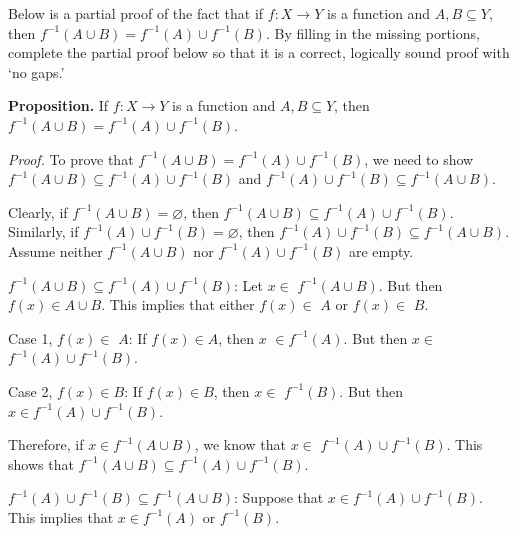 \documentclass[11pt,letterpaper]{article}
\newcommand{\ansun}[2]{\underline{\hspace{#1}#2\hspace{#1}}} %
\begin{document}
\newpage



 Below is a partial proof of the fact that if $f: X \to Y$ is a function and $A, B \subseteq Y$, then $f^{-1}(A \cup B)= f^{-1}(A) \cup f^{-1}(B)$. By filling in the missing portions, complete the partial proof below so that it is a correct, logically sound proof with `no gaps.' \pspace

\noindent \textbf{Proposition.} If $f: X \to Y$ is a function and $A, B \subseteq Y$, then $f^{-1}(A \cup B)= f^{-1}(A) \cup f^{-1}(B)$. \pspace

\textit{Proof.} To prove that $f^{-1}(A \cup B)= f^{-1}(A) \cup f^{-1}(B)$, we need to show \ansun{0cm}{$f^{-1}(A \cup B) \subseteq f^{-1}(A) \cup f^{-1}(B)$} \pspace and \ansun{0cm}{$f^{-1}(A) \cup f^{-1}(B) \subseteq f^{-1}(A \cup B)$}. 


Clearly, if $f^{-1}(A \cup B)= \varnothing$, then $f^{-1}(A \cup B) \subseteq f^{-1}(A) \cup f^{-1}(B)$. Similarly, if $f^{-1}(A) \cup f^{-1}(B)= \varnothing$, then $f^{-1}(A) \cup f^{-1}(B) \subseteq f^{-1}(A \cup B)$. Assume neither $f^{-1}(A \cup B)$ nor $f^{-1}(A) \cup f^{-1}(B)$ are empty. 


$f^{-1}(A \cup B) \subseteq f^{-1}(A) \cup f^{-1}(B)$: Let $x \in$ \ansun{0.52cm}{$f^{-1}(A \cup B)$}. But then $f(x) \in A \cup B$. This implies \pspace that either $f(x) \in$ \ansun{1.35cm}{$A$} or $f(x) \in$ \ansun{1.35cm}{$B$}. \pspace

	\hspace{1cm} Case 1, $f(x) \in$ \ansun{1.35cm}{$A$}: If $f(x) \in A$, then \ansun{1.38cm}{$x$} $\in f^{-1}(A)$. But then \pspace \hspace{1cm} $x \in$ \ansun{0.55cm}{$f^{-1}(A) \cup f^{-1}(B)$}. \pvspace{1cm}

	\hspace{1cm} Case 2, $f(x) \in B$: If $f(x) \in B$, then $x \in$ \ansun{0.9cm}{$f^{-1}(B)$}. But then $x \in f^{-1}(A) \cup f^{-1}(B)$. \pvspace{1cm}

Therefore, if $x \in f^{-1}(A \cup B)$, we know that $x \in$ \ansun{1.07cm}{$f^{-1}(A) \cup f^{-1}(B)$}. This shows \pspace that $f^{-1}(A \cup B) \subseteq f^{-1}(A) \cup f^{-1}(B)$. 


$f^{-1}(A) \cup f^{-1}(B) \subseteq f^{-1}(A \cup B)$: Suppose that \ansun{0.72cm}{$x \in f^{-1}(A) \cup f^{-1}(B)$}. This implies \pspace that $x \in f^{-1}(A)$ or $f^{-1}(B)$. \pspace
\end{document}
